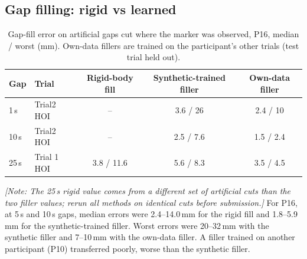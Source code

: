 \documentclass[11pt,a4paper]{article}
\newcommand{\note}[1]{\textcolor{orange!80!black}{\textit{[Note: #1]}}}
\begin{document}
\subsection{Gap filling: rigid vs learned}\label{sec:val-fill}
\begin{table}[h]\centering\small
\caption{Gap-fill error on artificial gaps cut where the marker was observed, P16, median / worst (mm).
Own-data fillers are trained on the participant's other trials (test trial held out).}\label{tab:gapfill}
\begin{tabular}{llccc}\toprule
Gap & Trial & Rigid-body fill & Synthetic-trained filler & Own-data filler \\\midrule
1\,s & Trial2 HOI & -- & 3.6 / 26 & 2.4 / 10 \\
10\,s & Trial2 HOI & -- & 2.5 / 7.6 & 1.5 / 2.4 \\
25\,s & Trial 1 HOI & 3.8 / 11.6 & 5.6 / 8.3 & 3.5 / 4.5 \\\bottomrule
\end{tabular}
\end{table}
\note{The 25\,s rigid value comes from a different set of artificial cuts than the two filler values; rerun all methods on identical cuts before submission.}
For P16, at 5\,s and 10\,s gaps, median errors were 2.4--14.0\,mm for the rigid fill and 1.8--5.9\,mm for the
synthetic-trained filler. Worst errors were 20--32\,mm with the synthetic filler and 7--10\,mm with the own-data filler.
A filler trained on another participant (P10) transferred poorly, worse than the synthetic filler.
\end{document}
